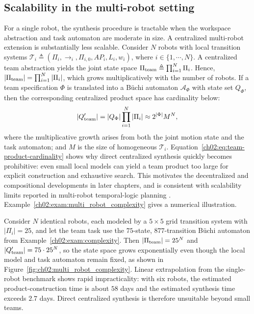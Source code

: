 
\subsection{Scalability in the multi-robot setting}
\label{ch02:sssec:multi_robot_scalability}

For a single robot, the synthesis procedure is tractable when the workspace
abstraction and task automaton are moderate in size. A centralized multi-robot
extension is substantially less scalable.
Consider $N$ robots with local transition systems
$\mathcal{T}_i \triangleq
\left(\Pi_i,\longrightarrow_i,\Pi_{i,0},AP_i,L_i,w_i\right)$,
where $i \in \{1,\cdots,N\}$. A centralized team abstraction yields the joint
state space
$\Pi_{\textup{team}} \triangleq \prod_{i=1}^{N} \Pi_i$.
Hence,
$|\Pi_{\textup{team}}| = \prod_{i=1}^{N} |\Pi_i|$,
which grows multiplicatively with the number of robots.
If a team specification $\Phi$ is translated into a B\"uchi automaton
$\mathcal{A}_{\Phi}$ with state set $Q_{\Phi}$, then the corresponding
centralized product space has cardinality below:
\begin{equation}
|Q_{\textup{team}}'|
=
|Q_{\Phi}|
\prod_{i=1}^{N} |\Pi_i|\approx 2^{|\Phi|} M^N,
\label{ch02:eq:team-product-cardinality}
\end{equation}
where the multiplicative growth arises from both the joint motion state and the
task automaton;
and $M$ is the size of homogeneous $\mathcal{T}_i$.
Equation~\eqref{ch02:eq:team-product-cardinality} shows why direct centralized
synthesis quickly becomes prohibitive: even small local models can yield a team
product too large for explicit construction and exhaustive search. This
motivates the decentralized and compositional developments in later chapters,
and is consistent with scalability limits reported in multi-robot
temporal-logic planning
\citep{kloetzer2010automatic,chen2012formal,kloetzer2011multi,guo2015multi}.
Example~\ref{ch02:exam:multi_robot_complexity} gives a numerical illustration.

\begin{example}
\label{ch02:exam:multi_robot_complexity}
Consider $N$ identical robots, each modeled by a $5 \times 5$ grid transition
system with $|\Pi_i| = 25$, and let the team task use the $75$-state,
$877$-transition B\"uchi automaton from Example~\ref{ch02:exam:complexity}.
Then $|\Pi_{\textup{team}}| = 25^N$ and
$|Q'_{\textup{team}}| = 75 \cdot 25^N$, so the state space grows exponentially
even though the local model and task automaton remain fixed,
as shown in Figure~\ref{fig:ch02:multi_robot_complexity}.
Linear extrapolation from the single-robot benchmark shows rapid impracticality: with
six robots, the estimated product-construction time is about $58$ days and the
estimated synthesis time exceeds $2.7$ days. Direct centralized synthesis is
therefore unsuitable beyond small teams.
\end{example}


